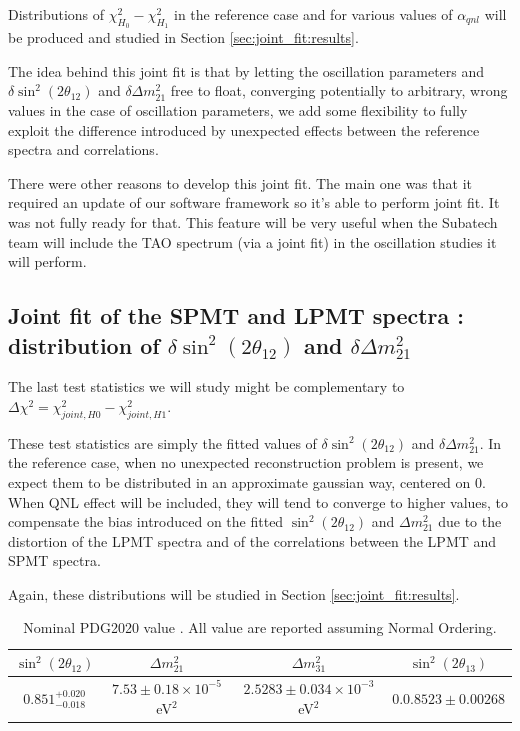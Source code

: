 \documentclass[../main.tex]{subfiles}
\begin{document}
Distributions of $\chi^2_{H_0}-\chi^2_{H_1}$ in the reference case and for various values of $\alpha_{qnl}$ will be produced and studied in Section \ref{sec:joint_fit:results}.

The idea behind this joint fit is that by letting the oscillation parameters and $\delta \sin^2(2\theta_{12})$ and $\delta \Delta m^2_{21}$ free to float, converging potentially to arbitrary, wrong values in the case of oscillation parameters, we add some flexibility to fully exploit the difference introduced by unexpected effects between the reference spectra and correlations.

There were other reasons to develop this joint fit. The main one was that it required an update of our software framework so it's able to perform joint fit. It was not fully ready for that. This feature will be very useful when the Subatech team will include the TAO spectrum (via a joint fit) in the oscillation studies it will perform.

\subsection{Joint fit of the SPMT and LPMT spectra : distribution of $\delta \sin^2(2\theta_{12})$ and $\delta \Delta m^2_{21}$}
\label{sec:joint_fit:delta_distrib}

The last test statistics we will study might be complementary to $ \Delta \chi^2 = \chi^2_{joint,H0} - \chi^2_{joint, H1} $.

These test statistics are simply the fitted values of $\delta \sin^2(2\theta_{12})$ and $\delta \Delta m^2_{21}$. In the reference case, when no unexpected reconstruction problem
is present, we expect them to be distributed in an approximate gaussian way, centered on 0. When QNL effect will be included, they will tend to converge to higher values, to compensate the bias introduced on the fitted $\sin^2(2\theta_{12})$ and $\Delta m^2_{21}$ due to the distortion of the LPMT spectra and of the correlations between the LPMT and SPMT spectra.

Again, these distributions will be studied in Section \ref{sec:joint_fit:results}.

\begin{table}
  \centering
  \begin{tabular}{c|c|c|c}
    $\sin^2(2\theta_{12})$    & $\Delta m^2_{21}$                       & $\Delta m^2_{31}$      & $\sin^2(2\theta_{13})$ \\
    \hline
    $0.851^{+0.020}_{-0.018}$ & $7.53 \pm 0.18 \times 10^{-5}$ eV$^2$   & $2.5283 \pm 0.034 \times 10^{-3}$ eV$^2$  & $0.0.8523 \pm 0.00268$
  \end{tabular}
  \caption{Nominal PDG2020 value \cite{particle_data_group_review_2020}. All value are reported assuming Normal Ordering.}
  \label{tab:joint_fit:pdg_value}
\end{table}
\end{document}
